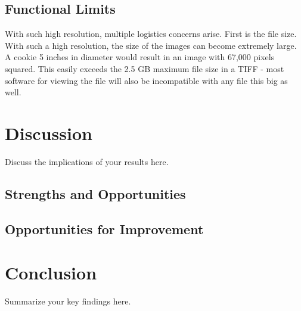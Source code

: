 \documentclass[a4paper,12pt]{article}
\begin{document}
\subsection{Functional Limits}
With such high resolution, multiple logistics concerns arise. First is the file size. With such a high resolution, the size of the images can become extremely large. A cookie
5 inches in diameter would result in an image with 67,000 pixels squared. This easily exceeds the 2.5 GB maximum file size in a TIFF - most software for viewing the file will also 
be incompatible with any file this big as well. 

\section{Discussion}
Discuss the implications of your results here.

\subsection{Strengths and Opportunities}

\subsection{Opportunities for Improvement}

\section{Conclusion}
Summarize your key findings here.



\end{document}
